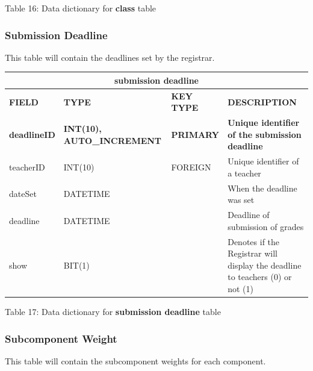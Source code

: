 \documentclass[11pt,a4paper,titlepage]{article}
\begin{document}
\vspace{.5cm}
\begin{center}
    Table 16: Data dictionary for \textbf{class} table
\end{center}


\subsubsection{Submission Deadline}

This table will contain the deadlines set by the registrar.

\vspace{1cm}
\begin{longtable}{ |p{2.5cm}|p{4.5cm}|p{2.5cm}|p{3cm}|  }
    \hline
    \multicolumn{4}{|c|}{\textbf{submission deadline}} \\
    \hline
    \textbf{FIELD}&\textbf{TYPE}&\textbf{KEY TYPE}&\textbf{DESCRIPTION}\\
    \hline
    \textbf{deadlineID}  & \textbf{INT(10), AUTO\_INCREMENT} & \textbf{PRIMARY} & \textbf{Unique identifier of the submission deadline}\\ \hline
    teacherID   & INT(10) & FOREIGN & Unique identifier of a teacher\\ \hline
    dateSet   & DATETIME &  & When the deadline was set\\ \hline
    deadline   & DATETIME &  & Deadline of submission of grades\\ \hline
    show   & BIT(1) &  & Denotes if the Registrar will display the deadline to teachers (0) or not (1)\\ \hline
\end{longtable}

\vspace{.5cm}
\begin{center}
    Table 17: Data dictionary for \textbf{submission deadline} table
\end{center}


\subsubsection{Subcomponent Weight}

This table will contain the subcomponent weights for each component.
\end{document}
